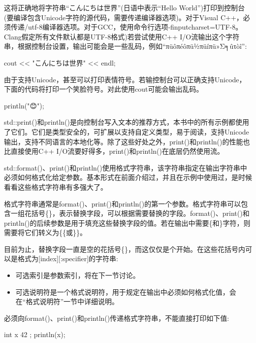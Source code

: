 这将正确地将字符串“こんにちは世界”(日语中表示“Hello World”)打印到控制台(要编译包含Unicode字符的源代码，需要传递编译器选项)。对于Visual C++，必须传递/utf-8编译器选项。对于GCC，使用命令行选项-finputcharset=UTF-8。Clang假定所有文件默认都是UTF-8格式)若尝试使用C++ I/O流输出这个字符串，根据控制台设置，输出可能会是一些乱码，例如“πüôπéôπü½πüíπü»Σ╕ûτòî”:

\begin{cpp}
cout << "こんにちは世界" << endl;
\end{cpp}

由于支持Unicode，甚至可以打印表情符号。若输控制台可以正确支持Unicode，下面的代码将打印一个笑脸符号。对此使用cout可能会输出乱码。

\newfontfamily{}
println("{\emojifont 😊}");

std::print()和println()是向控制台写入文本的推荐方式，本书中的所有示例都使用了它们。它们是类型安全的，可扩展以支持自定义类型，易于阅读，支持Unicode输出，支持不同语言的本地化等。除了这些好处之外，print()和println()的性能也比直接使用C++ I/O流要好得多，print()和println()在底层仍然使用流。


std::format()、print()和println()使用格式字符串，该字符串指定在输出字符串中必须如何格式化给定参数。基本形式在前面介绍过，并且在示例中使用过，是时候看看这些格式字符串有多强大了。

格式字符串通常是format()、print()和println()的第一个参数。格式字符串可以包含一组花括号\{\}，表示替换字段，可以根据需要替换的字段。format()、print()和println()的后续参数是用于填充这些替换字段的值。若在输出中需要\{和\}字符，则需要将它们转义为\{\{或\}\}。

目前为止，替换字段一直是空的花括号\{\}，而这仅仅是个开始。在这些花括号内可以是格式为[index][:specifier]的字符串:

\begin{itemize}
\item
可选索引是参数索引，将在下一节讨论。

\item
可选说明符是一个格式说明符，用于规定在输出中必须如何格式化值，会在“格式说明符”一节中详细说明。
\end{itemize}

必须向format()、print()和println()传递格式字符串，不能直接打印如下值:

\begin{cpp}
int x { 42 };
println(x);
\end{cpp}

